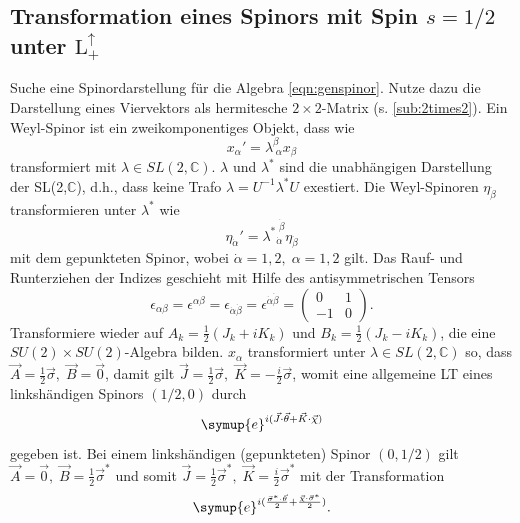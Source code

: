 \documentclass[
  captions=tableheading,  %
  titlepage=firstiscover, %
]{scrartcl}
\begin{document}
\subsection{Transformation eines Spinors mit Spin \texorpdfstring{$s = 1/2$}{PDFstring}
unter \texorpdfstring{$\text{L}_+^{\uparrow}$}{PDFstring}}
Suche eine Spinordarstellung für die Algebra \eqref{eqn:genspinor}.
Nutze dazu die Darstellung eines Viervektors als hermitesche $2\times 2$-Matrix (s. \ref{sub:2times2}).
Ein Weyl-Spinor ist ein zweikomponentiges Objekt, dass wie 
\begin{equation*}
  x_{\alpha}' = \lambda_{\; \alpha}^{\beta} x_{\beta}
\end{equation*}
transformiert mit $\lambda \in SL(2, \mathbb{C})$.
$\lambda$ und $\lambda^*$ sind die unabhängigen Darstellung der SL(2,$\mathbb{C}$), d.h., dass 
keine Trafo $\lambda = U^{-1} \lambda^* U$ exestiert.
Die Weyl-Spinoren $\eta_{\dot{\beta}}$ transformieren unter $\lambda^*$ wie 
\begin{equation*}
  \eta_{\dot{\alpha}}' =  {\lambda^{*}}_{ \!\! \dot{\alpha}}^{\; \dot{\beta}} \eta_{\dot{\beta}}
\end{equation*}
mit dem gepunkteten Spinor, wobei $\dot{\alpha} = 1,2, \; \alpha  = 1,2$ gilt.
Das Rauf- und Runterziehen der Indizes geschieht mit Hilfe des antisymmetrischen Tensors  
\begin{equation*}
  \epsilon_{\alpha \beta} = \epsilon^{\alpha \beta} = \epsilon_{\dot{\alpha} \dot{\beta}} =
  \epsilon^{\dot{\alpha} \dot{\beta}}  = 
  \begin{pmatrix}
    0 & 1 \\
    -1 & 0
  \end{pmatrix} .
\end{equation*}
Transformiere wieder auf $A_k = \frac{1}{2} (J_k + i K_k)$ und $B_k = \frac{1}{2} (J_k - i K_k)$, die eine 
$SU(2) \times SU(2)$-Algebra bilden.
$x_{\alpha}$ transformiert unter $\lambda \in SL(2, \mathbb{C})$ so, dass 
$\vec{A} = \frac{1}{2}\vec{\sigma}, \; \vec{B} = \vec{0}$, damit gilt 
$\vec{J} =\frac{1}{2}\vec{\sigma}, \; \vec{K} = -\frac{i}{2}\vec{\sigma}$, womit eine 
allgemeine LT eines linkshändigen Spinors $(1/2, 0)$ durch 
\begin{equation*}
  \symup{e}^{i(\vec{J}\cdot \vec{\theta} + \vec{K} \cdot \vec{\chi})}
\end{equation*}
gegeben ist.
Bei einem linkshändigen (gepunkteten) Spinor $(0, 1/2)$ gilt
$\vec{A} = \vec{0}, \; \vec{B} = \frac{1}{2}\vec{\sigma}^*$ und somit 
$\vec{J} =\frac{1}{2}\vec{\sigma}^*, \; \vec{K} = \frac{i}{2}\vec{\sigma}^*$ 
mit der Transformation 
\begin{equation*}
  \symup{e}^{i(\frac{\vec{\sigma}^* \cdot \vec{\theta}}{2} + \frac{\vec{\chi} \cdot \vec{\sigma}^*}{2})}.
\end{equation*}
\end{document}
